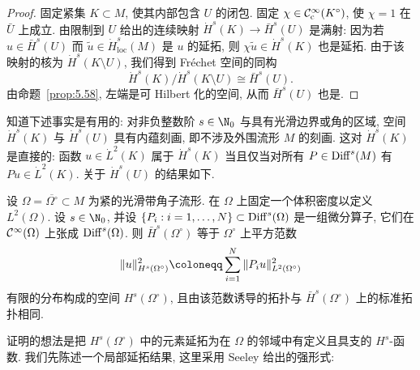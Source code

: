 \begin{proof}
固定紧集 $K \subset M$, 使其内部包含 $U$ 的闭包. 固定 $\chi \in \mathcal{C}_{\mathrm{c}}^\infty(K^\circ)$, 使 $\chi = 1$ 在 $\bar U$ 上成立. 由限制到 $U$ 给出的连续映射 $\dot{H}^s(K) \to \bar{H}^s(U)$ 是满射: 因为若 $u \in \bar{H}^s(U)$ 而 $\tilde u \in \dot{H}_{\mathrm{loc}}^s(M)$ 是 $u$ 的延拓, 则 $\chi \tilde u \in \dot{H}^s(K)$ 也是延拓. 由于该映射的核为 $\dot{H}^s(K \setminus U)$, 我们得到 Fréchet 空间的同构
\begin{equation}\label{eq:9.70}
    \dot{H}^s(K) / \dot{H}^s(K \setminus U) \cong \bar{H}^s(U).
\end{equation}
由命题~\ref{prop:5.58}, 左端是可 Hilbert 化的空间, 从而 $\bar{H}^s(U)$ 也是.
\end{proof}

知道下述事实是有用的: 对非负整数阶 $s \in \N_0$ 与具有光滑边界或角的区域, 空间 $\dot{H}^s(K)$ 与 $\dot{H}^s(U)$ 具有内蕴刻画, 即不涉及外围流形 $M$ 的刻画. 这对 $\dot{H}^s(K)$ 是直接的: 函数 $u \in \dot{L}^2(K)$ 属于 $\dot{H}^s(K)$ 当且仅当对所有 $P \in \operatorname{Diff}^s(M)$ 有 $P u \in \dot{L}^2(K)$. 关于 $\dot{H}^s(U)$ 的结果如下.

\begin{proposition}\label{prop:9.24}
设 $\Omega = \overline{\Omega^\circ} \subset M$ 为紧的光滑带角子流形. 在 $\Omega$ 上固定一个体积密度以定义 $L^2(\Omega)$. 设 $s \in \N_0$, 并设 $\{P_i : i = 1, \ldots, N\} \subset \operatorname{Diff}^s(\Omega)$ 是一组微分算子, 它们在 $\mathcal{C}^\infty(\Omega)$ 上张成 $\operatorname{Diff}^s(\Omega)$. 则 $\bar{H}^s(\Omega^\circ)$ 等于 $\Omega^\circ$ 上平方范数
\begin{equation}\label{eq:9.71}
    \|u\|_{H^s(\Omega^\circ)}^2 \defeq \sum_{i=1}^{N} \|P_i u\|_{L^2(\Omega^\circ)}^2
\end{equation}
有限的分布构成的空间 $H^s(\Omega^\circ)$, 且由该范数诱导的拓扑与 $\bar{H}^s(\Omega^\circ)$ 上的标准拓扑相同.
\end{proposition}

证明的想法是把 $H^s(\Omega^\circ)$ 中的元素延拓为在 $\Omega$ 的邻域中有定义且具支的 $H^s$-函数. 我们先陈述一个局部延拓结果, 这里采用 Seeley \cite{See64} 给出的强形式:

